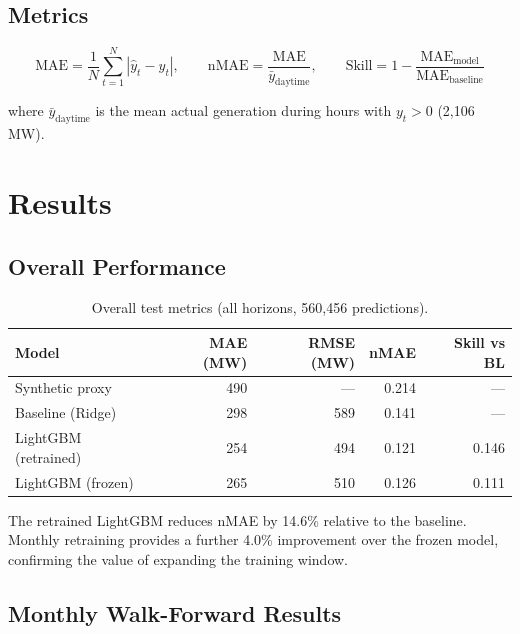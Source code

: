\documentclass[11pt,a4paper]{article}
\begin{document}
\subsection{Metrics}

\begin{equation}
\text{MAE} = \frac{1}{N}\sum_{t=1}^{N} |\hat{y}_t - y_t|, \qquad
\text{nMAE} = \frac{\text{MAE}}{\bar{y}_{\text{daytime}}}, \qquad
\text{Skill} = 1 - \frac{\text{MAE}_{\text{model}}}{\text{MAE}_{\text{baseline}}}
\end{equation}

where $\bar{y}_{\text{daytime}}$ is the mean actual generation during hours with $y_t > 0$ (2,106\,MW).

\section{Results}

\subsection{Overall Performance}

\begin{table}[H]
\centering
\caption{Overall test metrics (all horizons, 560{,}456 predictions).}\label{tab:overall}
\small
\begin{tabular}{@{}lrrrr@{}}
\toprule
Model & MAE (MW) & RMSE (MW) & nMAE & Skill vs BL \\
\midrule
Synthetic proxy & 490 & --- & 0.214 & --- \\
Baseline (Ridge) & 298 & 589 & 0.141 & --- \\
LightGBM (retrained) & 254 & 494 & 0.121 & 0.146 \\
LightGBM (frozen) & 265 & 510 & 0.126 & 0.111 \\
\bottomrule
\end{tabular}
\end{table}

The retrained LightGBM reduces nMAE by 14.6\% relative to the baseline.
Monthly retraining provides a further 4.0\% improvement over the frozen model, confirming the value of expanding the training window.

\subsection{Monthly Walk-Forward Results}
\end{document}
